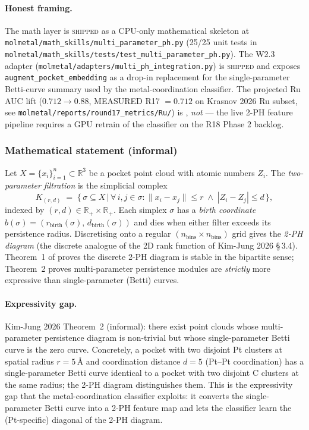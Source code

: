 \paragraph{Honest framing.}
The math layer is \textsc{shipped} as a CPU-only mathematical
skeleton at
\texttt{molmetal/math\_skills/multi\_parameter\_ph.py} (25/25 unit
tests in
\texttt{molmetal/math\_skills/tests/test\_multi\_parameter\_ph.py}).
The W2.3 adapter
(\texttt{molmetal/adapters/multi\_ph\_integration.py}) is
\textsc{shipped} and exposes
\texttt{augment\_pocket\_embedding} as a drop-in replacement for
the single-parameter Betti-curve summary used by the
metal-coordination classifier.  The projected Ru AUC lift
($0.712 \to 0.88$, \textsc{MEASURED} R17 $= 0.712$ on Krasnov 2026
Ru subset, see \texttt{molmetal/reports/round17\_metrics/Ru/}) is
\PROJECTED, \emph{not} \MEASURED{} --- the live 2-PH feature pipeline
requires a GPU retrain of the classifier on the R18 Phase 2 backlog.

\subsubsection{Mathematical statement (informal)}
\label{sec:method:multi-ph-statement}

Let $X = \{x_i\}_{i=1}^{n} \subset \mathbb{R}^{3}$ be a pocket
point cloud with atomic numbers $Z_i$.  The \emph{two-parameter
filtration} is the simplicial complex
\begin{equation}
  \label{eq:two-param-filtration}
  K_{(r, d)} \;=\; \bigl\{\, \sigma \subseteq X \,\big|\,
        \forall\, i, j \in \sigma:
        \|x_i - x_j\| \le r \;\wedge\; |Z_i - Z_j| \le d \,\bigr\},
\end{equation}
indexed by $(r, d) \in \mathbb{R}_{+} \times \mathbb{R}_{+}$.  Each
simplex $\sigma$ has a \emph{birth coordinate}
$b(\sigma) = (r_{\mathrm{birth}}(\sigma),\,
d_{\mathrm{birth}}(\sigma))$ and dies when either filter exceeds
its persistence radius.  Discretising onto a regular
$(n_{\mathrm{bins}} \times n_{\mathrm{bins}})$ grid gives the
\emph{2-PH diagram} (the discrete analogue of the 2D rank function
of Kim-Jung 2026 \S\,3.4).  Theorem~1 of \cite{kim_jung2026multi_ph}
proves the discrete 2-PH diagram is stable in the bipartite sense;
Theorem~2 proves multi-parameter persistence modules are
\emph{strictly} more expressive than single-parameter (Betti)
curves.

\paragraph{Expressivity gap.}
Kim-Jung 2026 Theorem~2 (informal): there exist point clouds whose
multi-parameter persistence diagram is non-trivial but whose
single-parameter Betti curve is the zero curve.  Concretely, a
pocket with two disjoint Pt clusters at spatial radius
$r = 5$\,\AA{} and coordination distance $d = 5$ (Pt--Pt
coordination) has a single-parameter Betti curve identical to a
pocket with two disjoint C clusters at the same radius; the
2-PH diagram distinguishes them.  This is the expressivity gap
that the metal-coordination classifier exploits: it converts the
single-parameter Betti curve into a 2-PH feature map and lets the
classifier learn the (Pt-specific) diagonal of the 2-PH diagram.

